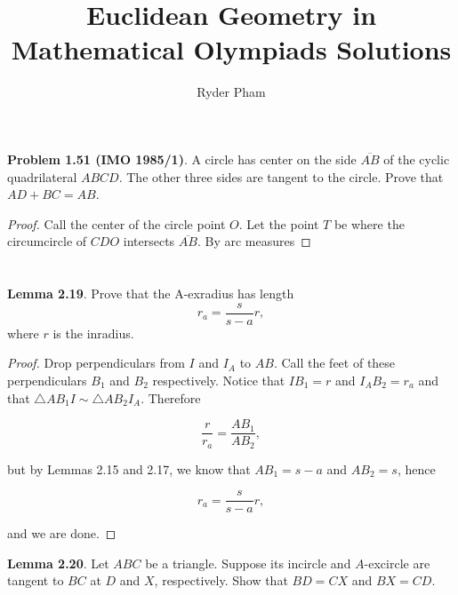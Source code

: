 \documentclass[letterpaper,oneside]{book}
\providecommand{\ol}{\overline}
\begin{document}
\title{Euclidean Geometry in Mathematical Olympiads Solutions}
\author{Ryder Pham}
\maketitle

\chapter{}
\textbf{Problem 1.51 (IMO 1985/1)}. A circle has center on the side $\ol{AB}$ of the cyclic quadrilateral $ABCD$. The other three sides are tangent to the circle. Prove that $AD + BC = AB$.
\begin{proof}
  Call the center of the circle point $O.$ Let the point $T$ be where the circumcircle of $CDO$ intersects $\ol{AB}.$ By arc measures
\end{proof}
\chapter{}
\textbf{Lemma 2.19}. Prove that the A-exradius has length
$$r_a = \frac{s}{s-a}r,$$
where $r$ is the inradius.

\begin{proof}
    Drop perpendiculars from $I$ and $I_A$ to $AB$. Call the feet of these perpendiculars $B_1$ and $B_2$ respectively. Notice that $IB_1 = r$ and $I_AB_2 = r_a$ and that $\triangle AB_1I \sim \triangle AB_2I_A$. Therefore 

$$\frac{r}{r_a} = \frac{AB_1}{AB_2},$$

but by Lemmas 2.15 and 2.17, we know that $AB_1 = s-a$ and $AB_2 = s$, hence 

$$r_a = \frac{s}{s-a}r,$$

and we are done.
\end{proof}

\textbf{Lemma 2.20}.   Let $ABC$ be a triangle. Suppose its incircle and $A$-excircle are tangent to $BC$ at $D$ and $X$, respectively. Show that $BD = CX$ and $BX = CD$. 
\end{document}
